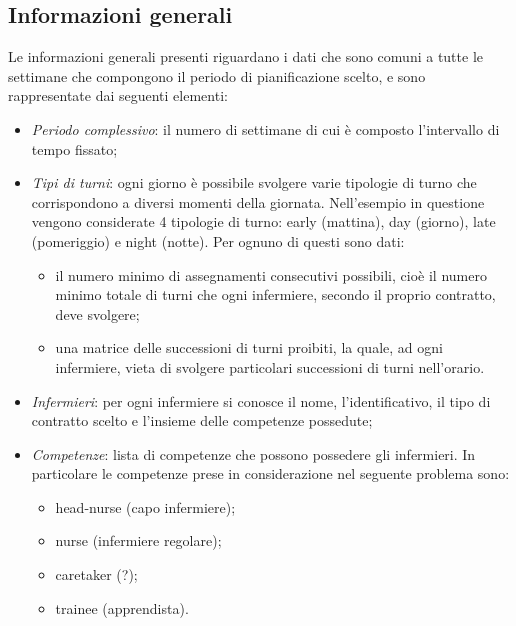 \subsection{Informazioni generali}
Le informazioni generali presenti riguardano i dati che sono comuni a tutte le settimane che compongono il periodo di pianificazione scelto, e sono rappresentate dai seguenti elementi:
\begin{itemize}

\item \textit{Periodo complessivo}: il numero di settimane di cui è composto l'intervallo di tempo fissato;

\item \textit{Tipi di turni}: ogni giorno è possibile svolgere varie tipologie di turno che corrispondono a diversi momenti della giornata. Nell'esempio in questione vengono considerate 4 tipologie di turno: early (mattina), day (giorno), late (pomeriggio) e night (notte). Per ognuno di questi sono dati:
\begin{itemize}
\item il numero minimo di assegnamenti consecutivi possibili, cioè il numero minimo totale di turni che ogni infermiere, secondo il proprio contratto, deve svolgere;
\item una matrice delle successioni di turni proibiti, la quale, ad ogni infermiere, vieta di svolgere particolari successioni di turni nell'orario.
\end{itemize}

\item \textit{Infermieri}: per ogni infermiere si conosce il nome, l'identificativo, il tipo di contratto scelto e l'insieme delle competenze possedute;

\item \textit{Competenze}: lista di competenze che possono possedere gli infermieri. In particolare le competenze prese in considerazione nel seguente problema sono:
\begin{itemize}
\item head-nurse (capo infermiere);
\item nurse (infermiere regolare);
\item caretaker (?);
\item trainee (apprendista).
\end{itemize}


\end{itemize}
